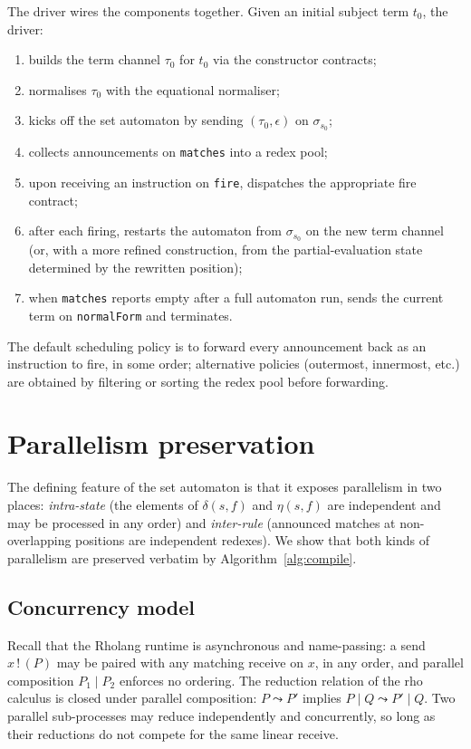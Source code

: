 \documentclass[11pt]{article}
\theoremstyle{plain}
\theoremstyle{definition}
\theoremstyle{remark}
\newcommand{\rew}{\leadsto}
\newcommand{\Send}[2]{#1 \,!\, (#2)}
\begin{document}
The driver wires the components together. Given an initial subject term
$t_0$, the driver:
\begin{enumerate}[leftmargin=*]
  \item builds the term channel $\tau_0$ for $t_0$ via the constructor
        contracts;
  \item normalises $\tau_0$ with the equational normaliser;
  \item kicks off the set automaton by sending $(\tau_0, \epsilon)$ on
        $\sigma_{s_0}$;
  \item collects announcements on \texttt{matches} into a redex pool;
  \item upon receiving an instruction on \texttt{fire}, dispatches the
        appropriate fire contract;
  \item after each firing, restarts the automaton from $\sigma_{s_0}$
        on the new term channel (or, with a more refined construction,
        from the partial-evaluation state determined by the rewritten
        position);
  \item when \texttt{matches} reports empty after a full automaton run,
        sends the current term on \texttt{normalForm} and terminates.
\end{enumerate}
The default scheduling policy is to forward every announcement back as
an instruction to fire, in some order; alternative policies (outermost,
innermost, etc.) are obtained by filtering or sorting the redex pool
before forwarding.

\section{Parallelism preservation}\label{sec:parallel}

The defining feature of the set automaton is that it exposes parallelism
in two places: \emph{intra-state} (the elements of $\delta(s, f)$ and
$\eta(s, f)$ are independent and may be processed in any order) and
\emph{inter-rule} (announced matches at non-overlapping positions are
independent redexes). We show that both kinds of parallelism are
preserved verbatim by Algorithm~\ref{alg:compile}.

\subsection{Concurrency model}

Recall that the Rholang runtime is asynchronous and name-passing: a send
$\Send{x}{P}$ may be paired with any matching receive on $x$, in any
order, and parallel composition $P_1 \mid P_2$ enforces no ordering. The
reduction relation of the rho calculus is closed under parallel
composition: $P \rew P'$ implies $P \mid Q \rew P' \mid Q$. Two parallel
sub-processes may reduce independently and concurrently, so long as
their reductions do not compete for the same linear receive.
\end{document}
